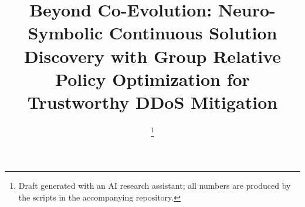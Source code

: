 \documentclass[journal]{IEEEtran}
\begin{document}
\title{Beyond Co-Evolution: Neuro-Symbolic Continuous Solution Discovery with Group Relative Policy Optimization for Trustworthy DDoS Mitigation}
\author{\thanks{Draft generated with an AI research assistant; all numbers are produced by the scripts in the accompanying repository.}}
\maketitle











\end{document}
